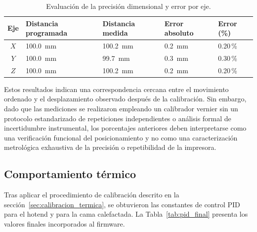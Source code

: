 \begin{table}[htbp]
    \centering
    \small
    \caption{Evaluación de la precisión dimensional y error por eje.}
    \label{tab:precision_ejes}
    \begin{tabularx}{\textwidth}{c X X X X}
        \toprule
        \textbf{Eje} & 
        \textbf{Distancia programada} & 
        \textbf{Distancia medida} & 
        \textbf{Error absoluto} & 
        \textbf{Error (\%)} \\
        \midrule
        \(X\) & \qty{100.0}{\mm} & \qty{100.2}{\mm} & \qty{0.2}{\mm} & 0.20\,\% \\
        \(Y\) & \qty{100.0}{\mm} & \qty{99.7}{\mm}  & \qty{0.3}{\mm} & 0.30\,\% \\
        \(Z\) & \qty{100.0}{\mm} & \qty{100.2}{\mm} & \qty{0.2}{\mm} & 0.20\,\% \\
        \bottomrule
    \end{tabularx}
\end{table}

Estos resultados indican una correspondencia cercana entre el movimiento ordenado y el desplazamiento observado después de la calibración. Sin embargo, dado que las mediciones se realizaron empleando un calibrador vernier sin un protocolo estandarizado de repeticiones independientes o análisis formal de incertidumbre instrumental, los porcentajes anteriores deben interpretarse como una verificación funcional del posicionamiento y no como una caracterización metrológica exhaustiva de la precisión o repetibilidad de la impresora.

\subsection{Comportamiento térmico}
\label{sec:validacion_termica}
Tras aplicar el procedimiento de calibración descrito en la 
sección~\ref{sec:calibracion_termica}, se obtuvieron las constantes de 
control PID para el hotend y para la cama calefactada. La 
Tabla~\ref{tab:pid_final} presenta los valores finales incorporados al 
firmware.

% 
%


